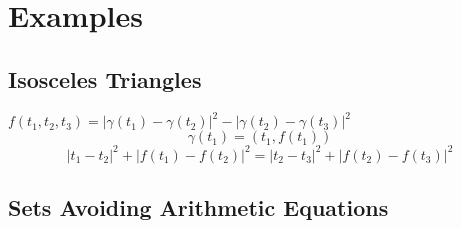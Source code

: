 \documentclass[12pt,reqno]{article}
\numberwithin{equation}{section}
\DeclareMathOperator{\RR}{\mathbf{R}}
\newtheorem{theorem}{Theorem}
\numberwithin{theorem}{section}
\begin{document}

\section{Examples}

\subsection{Isosceles Triangles}

$f(t_1,t_2,t_3) = |\gamma(t_1) - \gamma(t_2)|^2 - |\gamma(t_2) - \gamma(t_3)|^2$
\[ \gamma(t_1) = (t_1,f(t_1)) \]
\[ |t_1 - t_2|^2 + |f(t_1) - f(t_2)|^2 = |t_2 - t_3|^2 + |f(t_2) - f(t_3)|^2 \]

\subsection{Sets Avoiding Arithmetic Equations}
\end{document}
